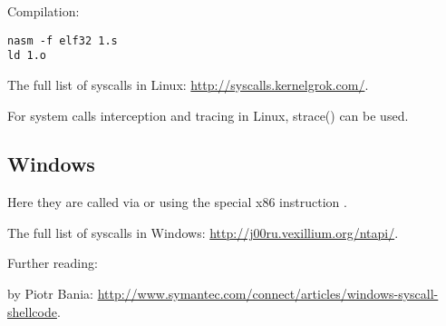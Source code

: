 

Compilation:

\begin{lstlisting}
nasm -f elf32 1.s
ld 1.o
\end{lstlisting}

The full list of syscalls in Linux: \url{http://syscalls.kernelgrok.com/}.

For system calls interception and tracing in Linux, strace() can be used.

\subsection{Windows}


Here they are called via  
or using the special x86 instruction .

The full list of syscalls in Windows: \url{http://j00ru.vexillium.org/ntapi/}.

Further reading:

 by Piotr Bania: \url{http://www.symantec.com/connect/articles/windows-syscall-shellcode}.

